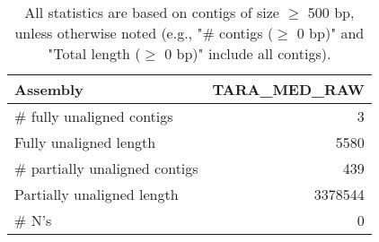 \documentclass[12pt,a4paper]{article}
\begin{document}
\begin{table}[ht]
\begin{center}
\caption{All statistics are based on contigs of size $\geq$ 500 bp, unless otherwise noted (e.g., "\# contigs ($\geq$ 0 bp)" and "Total length ($\geq$ 0 bp)" include all contigs).}
\begin{tabular}{|l*{1}{|r}|}
\hline
Assembly & TARA\_MED\_RAW \\ \hline
\# fully unaligned contigs & 3 \\ \hline
Fully unaligned length & 5580 \\ \hline
\# partially unaligned contigs & 439 \\ \hline
Partially unaligned length & 3378544 \\ \hline
\# N's & 0 \\ \hline
\end{tabular}
\end{center}
\end{table}
\end{document}
